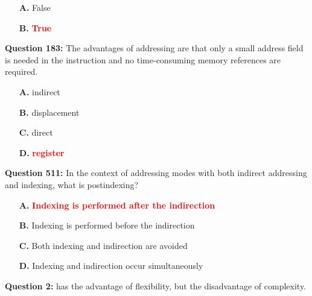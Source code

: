 \documentclass[12pt,a4paper]{article}
\begin{document}
\begin{itemize}
    \item[\textbf{A.}] False
    \item[\textbf{B.}] \textcolor{red}{\textbf{True}}
\end{itemize}

\vspace{0.5cm}

\vspace{0.5cm}

\textbf{Question 183:} The advantages of \underline{\hspace{1.5cm}} addressing are that only a small address field is needed in the instruction and no time-consuming memory references are required.

\begin{itemize}
    \item[\textbf{A.}] indirect
    \item[\textbf{B.}] displacement
    \item[\textbf{C.}] direct
    \item[\textbf{D.}] \textcolor{red}{\textbf{register}}
\end{itemize}

\vspace{0.5cm}

\vspace{0.5cm}

\textbf{Question 511:} In the context of addressing modes with both indirect addressing and indexing, what is postindexing?

\begin{itemize}
    \item[\textbf{A.}] \textcolor{red}{\textbf{Indexing is performed after the indirection}}
    \item[\textbf{B.}] Indexing is performed before the indirection
    \item[\textbf{C.}] Both indexing and indirection are avoided
    \item[\textbf{D.}] Indexing and indirection occur simultaneously
\end{itemize}

\vspace{0.5cm}

\vspace{0.5cm}

\textbf{Question 2:} \underline{\hspace{1.5cm}} has the advantage of flexibility, but the disadvantage of complexity.
\end{document}
